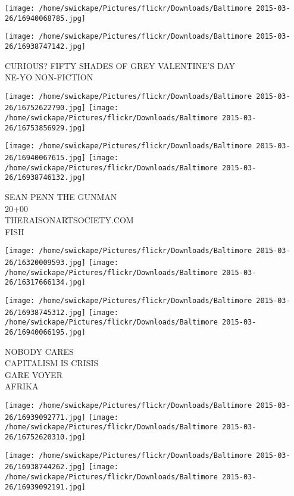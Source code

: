 \documentclass[10pt,letterpaper]{article}
\begin{document}
\texttt{[image: /home/swickape/Pictures/flickr/Downloads/Baltimore 2015-03-26/16940068785.jpg]}

\vspace{0.25in}
\texttt{[image: /home/swickape/Pictures/flickr/Downloads/Baltimore 2015-03-26/16938747142.jpg]}

CURIOUS?  FIFTY SHADES OF GREY VALENTINE'S DAY\\
NE{-}YO NON{-}FICTION\\
\pagebreak

\texttt{[image: /home/swickape/Pictures/flickr/Downloads/Baltimore 2015-03-26/16752622790.jpg]}
\texttt{[image: /home/swickape/Pictures/flickr/Downloads/Baltimore 2015-03-26/16753856929.jpg]}

\texttt{[image: /home/swickape/Pictures/flickr/Downloads/Baltimore 2015-03-26/16940067615.jpg]}
\texttt{[image: /home/swickape/Pictures/flickr/Downloads/Baltimore 2015-03-26/16938746132.jpg]}

SEAN PENN THE GUNMAN\\
20+00\\
THERAISONARTSOCIETY.COM\\
FISH\\
\pagebreak

\texttt{[image: /home/swickape/Pictures/flickr/Downloads/Baltimore 2015-03-26/16320009593.jpg]}
\texttt{[image: /home/swickape/Pictures/flickr/Downloads/Baltimore 2015-03-26/16317666134.jpg]}

\texttt{[image: /home/swickape/Pictures/flickr/Downloads/Baltimore 2015-03-26/16938745312.jpg]}
\texttt{[image: /home/swickape/Pictures/flickr/Downloads/Baltimore 2015-03-26/16940066195.jpg]}

NOBODY CARES\\
CAPITALISM IS CRISIS\\
GARE VOYER\\
AFRIKA\\
\pagebreak

\texttt{[image: /home/swickape/Pictures/flickr/Downloads/Baltimore 2015-03-26/16939092771.jpg]}
\texttt{[image: /home/swickape/Pictures/flickr/Downloads/Baltimore 2015-03-26/16752620310.jpg]}

\texttt{[image: /home/swickape/Pictures/flickr/Downloads/Baltimore 2015-03-26/16938744262.jpg]}
\texttt{[image: /home/swickape/Pictures/flickr/Downloads/Baltimore 2015-03-26/16939092191.jpg]}
\end{document}
